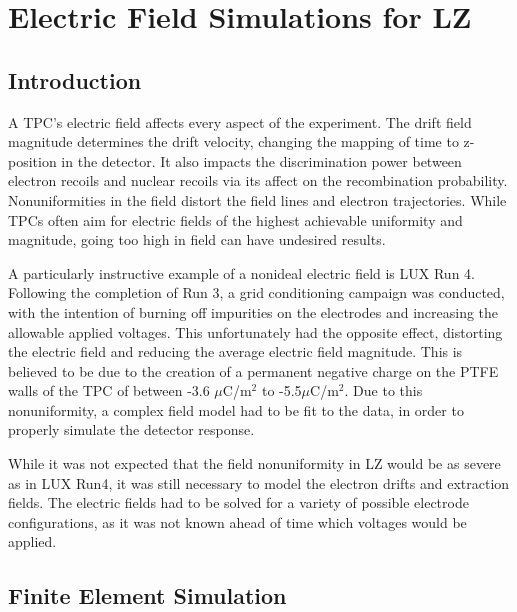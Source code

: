 \chapter{Electric Field Simulations for LZ}

\label{chap:fields}

\section{Introduction}
A TPC's electric field affects every aspect of the experiment.
The drift field magnitude determines the drift velocity, changing the mapping of time to z-position in the detector.
It also impacts the discrimination power between electron recoils and nuclear recoils via its affect on the recombination probability.
Nonuniformities in the field distort the field lines and electron trajectories. 
While TPCs often aim for electric fields of the highest achievable uniformity and magnitude, going too high in field can have undesired results.

A particularly instructive example of a nonideal electric field is LUX Run 4.
Following the completion of Run 3, a grid conditioning campaign was conducted, with the intention of burning off impurities on the electrodes and increasing the allowable applied voltages.
This unfortunately had the opposite effect, distorting the electric field and reducing the average electric field magnitude\cite{lux_collaboration_3d_2017}.
This is believed to be due to the creation of a permanent negative charge on the PTFE walls of the TPC of between -3.6 $\mu$C/m$^2$ to -5.5$\mu$C/m$^2$.
Due to this nonuniformity, a complex field model had to be fit to the data, in order to properly simulate the detector response.

While it was not expected that the field nonuniformity in LZ would be as severe as in LUX Run4, it was still necessary to  model the electron drifts and extraction fields.
The electric fields had to be solved for a variety of possible electrode configurations, as it was not known ahead of time which voltages would be applied.

\section{Finite Element Simulation}
